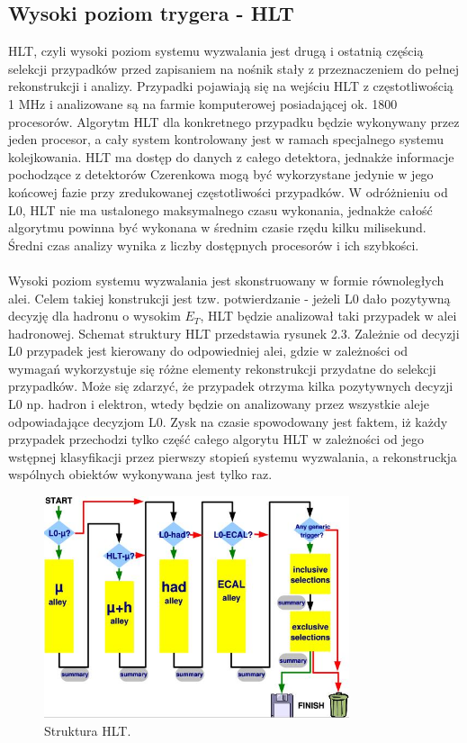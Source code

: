 \documentclass{pracamgr}
\begin{document}
\subsection{Wysoki poziom trygera - HLT}

HLT, czyli wysoki poziom systemu wyzwalania jest drugą i ostatnią częścią selekcji przypadków przed zapisaniem na nośnik stały z przeznaczeniem do pełnej rekonstrukcji i analizy. Przypadki pojawiają się na wejściu HLT z częstotliwością 1 MHz i analizowane są na farmie komputerowej posiadającej ok. 1800 procesorów. Algorytm HLT dla konkretnego przypadku będzie wykonywany przez jeden procesor, a cały system kontrolowany jest w ramach specjalnego systemu kolejkowania. HLT ma dostęp do danych z całego detektora, jednakże informacje pochodzące z detektorów Czerenkowa mogą być wykorzystane jedynie w jego końcowej fazie przy zredukowanej częstotliwości przypadków. W odróżnieniu od L0, HLT nie ma ustalonego maksymalnego czasu wykonania, jednakże całość algorytmu powinna być wykonana w średnim czasie rzędu kilku milisekund. Średni czas analizy wynika z liczby dostępnych procesorów i ich szybkości.
\\\\
\noindent
Wysoki poziom systemu wyzwalania jest skonstruowany w formie równoległych alei. Celem takiej konstrukcji jest tzw. potwierdzanie - jeżeli L0 dało pozytywną decyzję dla hadronu o wysokim $E_T$, HLT będzie analizował taki przypadek w alei hadronowej. Schemat struktury HLT przedstawia  rysunek 2.3. Zależnie od decyzji L0 przypadek jest kierowany do odpowiedniej alei, gdzie w zależności od wymagań wykorzystuje się różne elementy rekonstrukcji przydatne do selekcji przypadków. Może się zdarzyć, że przypadek otrzyma kilka pozytywnych decyzji L0 np. hadron i elektron, wtedy będzie on analizowany przez wszystkie aleje odpowiadające decyzjom L0. Zysk na czasie spowodowany jest faktem, iż każdy przypadek przechodzi tylko część całego algorytu HLT w zależności od jego wstępnej klasyfikacji przez pierwszy stopień systemu wyzwalania, a rekonstruckja wspólnych obiektów wykonywana jest tylko raz.
\\

\begin{figure}[!h]
 \centering
 \includegraphics[width=0.8\textwidth]{rysunki/introduction/aleje.jpg}
 \caption{Struktura HLT.}
\end{figure}
\end{document}
